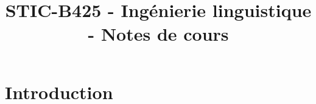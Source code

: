 

\title{STIC-B425 - Ingénierie linguistique - Notes de cours}



\maketitle

\section{Introduction}


